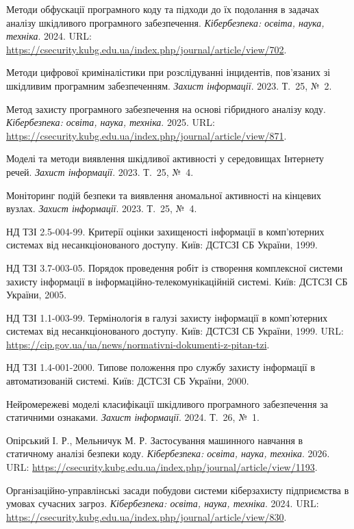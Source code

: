  Методи обфускації програмного коду та підходи до їх подолання в задачах аналізу шкідливого програмного забезпечення. \emph{Кібербезпека: освіта, наука, техніка}. 2024. URL: \url{https://csecurity.kubg.edu.ua/index.php/journal/article/view/702}.

 Методи цифрової криміналістики при розслідуванні інцидентів, пов'язаних зі шкідливим програмним забезпеченням. \emph{Захист інформації}. 2023. Т.~25, №~2.

 Метод захисту програмного забезпечення на основі гібридного аналізу коду. \emph{Кібербезпека: освіта, наука, техніка}. 2025. URL: \url{https://csecurity.kubg.edu.ua/index.php/journal/article/view/871}.

 Моделі та методи виявлення шкідливої активності у середовищах Інтернету речей. \emph{Захист інформації}. 2023. Т.~25, №~4.

 Моніторинг подій безпеки та виявлення аномальної активності на кінцевих вузлах. \emph{Захист інформації}. 2023. Т.~25, №~4.

 НД ТЗІ 2.5-004-99. Критерії оцінки захищеності інформації в комп'ютерних системах від несанкціонованого доступу. Київ: ДСТСЗІ СБ України, 1999.

 НД ТЗІ 3.7-003-05. Порядок проведення робіт із створення комплексної системи захисту інформації в інформаційно-телекомунікаційній системі. Київ: ДСТСЗІ СБ України, 2005.

 НД ТЗІ 1.1-003-99. Термінологія в галузі захисту інформації в комп'ютерних системах від несанкціонованого доступу. Київ: ДСТСЗІ СБ України, 1999. URL: \url{https://cip.gov.ua/ua/news/normativni-dokumenti-z-pitan-tzi}.

 НД ТЗІ 1.4-001-2000. Типове положення про службу захисту інформації в автоматизованій системі. Київ: ДСТСЗІ СБ України, 2000.

 Нейромережеві моделі класифікації шкідливого програмного забезпечення за статичними ознаками. \emph{Захист інформації}. 2024. Т.~26, №~1.

 Опірський І. Р., Мельничук М. Р. Застосування машинного навчання в статичному аналізі безпеки коду. \emph{Кібербезпека: освіта, наука, техніка}. 2026. URL: \url{https://csecurity.kubg.edu.ua/index.php/journal/article/view/1193}.

 Організаційно-управлінські засади побудови системи кіберзахисту підприємства в умовах сучасних загроз. \emph{Кібербезпека: освіта, наука, техніка}. 2024. URL: \url{https://csecurity.kubg.edu.ua/index.php/journal/article/view/830}.

